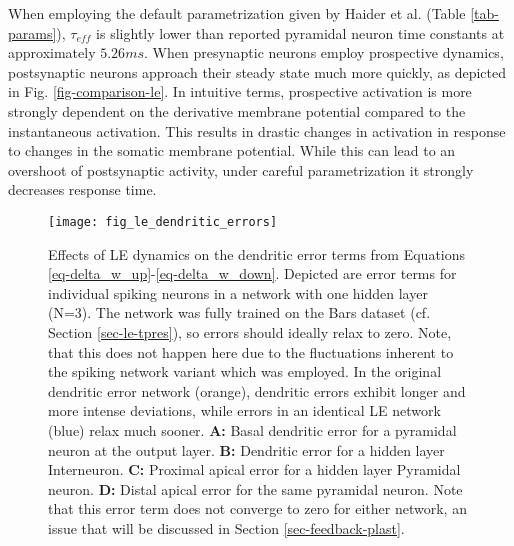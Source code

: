 When employing the default parametrization given by Haider et al. (Table \ref{tab-params}), $\tau_{eff}$ is slightly
lower than reported pyramidal neuron time constants \citep{McCormick1985} at approximately $5.26ms$. When presynaptic
neurons employ prospective dynamics, postsynaptic neurons approach their steady state much more quickly, as depicted in
Fig. \ref{fig-comparison-le}. In intuitive terms, prospective activation is more strongly dependent on the derivative
membrane potential compared to the instantaneous activation. This results in drastic changes in activation in response
to changes in the somatic membrane potential. While this can lead to an overshoot of postsynaptic activity, under
careful parametrization it strongly decreases response time.


\begin{figure}[h!]
  \centering
  \texttt{[image: fig\_le\_dendritic\_errors]}
  \caption[Effects of LE dynamics on dendritic error]{Effects of LE dynamics on the dendritic error terms from Equations
    \ref{eq-delta_w_up}-\ref{eq-delta_w_down}. Depicted are error terms for individual spiking neurons in a network with
    one hidden layer (N=3). The network was fully trained on the Bars dataset (cf. Section \ref{sec-le-tpres}), so
    errors should ideally relax to zero. Note, that this does not happen here due to the fluctuations inherent to the
    spiking network variant which was employed. In the original dendritic error network (orange), dendritic errors
    exhibit longer and more intense deviations, while errors in an identical LE network (blue) relax much sooner.
    \textbf{A:} Basal dendritic error for a pyramidal neuron at the output layer. \textbf{B:} Dendritic error for a
    hidden layer Interneuron. \textbf{C:} Proximal apical error for a hidden layer Pyramidal neuron. \textbf{D:} Distal
    apical error for the same pyramidal neuron. Note that this error term does not converge to zero for either network,
    an issue that will be discussed in Section \ref{sec-feedback-plast}.}
  \label{fig-error-comp-le}
\end{figure}


